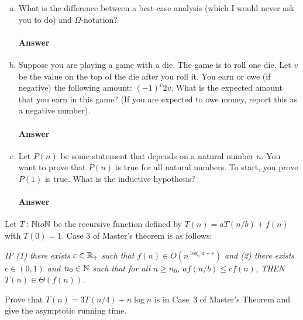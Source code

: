 \documentclass{article}
\begin{document}
\begin{enumerate}[(a)]
    \item What is the difference between a best-case analysis (which I would
        never ask you to do) and $\Omega$-notation?

        \paragraph{Answer} \todo{}

    \item Suppose you are playing a game with a die.  The game is to roll
        one die. Let $v$ be the value on the top of the die after you roll it.
        You earn or owe (if negative) the following amount: $(-1)^v 2v$.  What
        is the expected amount that you earn in this game?  (If you are expected
        to owe money, report this as a negative number).

        \paragraph{Answer} \todo{}

    \item Let $P(n)$ be some statement that depends on a natural number $n$.  You
        want to prove that $P(n)$ is true for all natural numbers.  To start,
        you prove $P(1)$ is true.  What is the inductive hypothesis?

        \paragraph{Answer} \todo{}

\end{enumerate}


\collab{\todo{}}

Let $T \colon {\mathbb N} to {\mathbb N}$ be the recursive function defined by $T(n)=a
T(n/b)+f(n)$ with $T(0)=1$.  Case 3 of Master's theorem is as follows:

\emph{IF (1) there exists $\varepsilon \in {\mathbb R}_+$ such that $f(n)
\in O(n^{\log_b a + \varepsilon})$ and (2) there exists $c \in
(0,1)$ and~$n_0 \in {\mathbb N}$ such that for all $n \geq n_0$, $a
f(n/b) \leq c f(n)$, THEN $T(n) \in \Theta(f(n))$.}

Prove that $T(n)=3T(n/4)+ n \log n$ is in Case~3 of Master's Theorem
and give the asymptotic running time.
\end{document}
